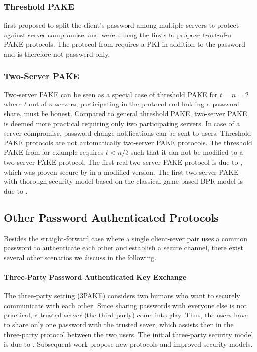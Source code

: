 \subsubsection{Threshold PAKE}
\citet{FordK00} first proposed to split the client's password among multiple servers to protect against server compromise.
\citet{RaimondoG03} and \citet{MacKenzieSJ02} were among the firsts to propose t-out-of-n \ac{PAKE} protocols.
The protocol from \citet{MacKenzieSJ02} requires a PKI in addition to the password and is therefore not password-only.

\subsubsection{Two-Server PAKE}
Two-server \ac{PAKE} can be seen as a special case of threshold PAKE for $t=n=2$ where $t$ out of $n$ servers, participating in the protocol and holding a password share, must be honest.
Compared to  general threshold \ac{PAKE}, two-server \ac{PAKE} is deemed more practical requiring only two participating servers.
In case of a server compromise, password change notifications can be sent to users.
Threshold \ac{PAKE} protocols are not automatically two-server \ac{PAKE} protocols.
The threshold \ac{PAKE} from \citet{RaimondoG03} for example requires $t<n/3$ such that it can not be modified to a two-server \ac{PAKE} protocol.
The first real two-server PAKE protocol is due to \citet{BrainardJKS03}, which was proven secure by \citet{SzydloK05} in a modified version.
The first two server PAKE with thorough security model based on the classical game-based BPR model is due to \citet{Katz2012a}.


\subsection{Other Password Authenticated Protocols} \label{sec:other-pake}
Besides the straight-forward case where a single client-sever pair uses a common password to authenticate each other and establish a secure channel, there exist several other scenarios we discuss in the following.

\paragraph{Three-Party Password Authenticated Key Exchange}
The three-party setting (3\ac{PAKE}) considers two humans who want to securely communicate with each other.
Since sharing passwords with everyone else is not practical, a trusted server (the third party) come into play.
Thus, the users have to share only one password with the trusted sever, which assists then in the three-party protocol between the two users.
The initial three-party security model is due to \citet{Abdalla2005}.
Subsequent work \cite{CliffTB06,Yoneyama08,TsaiC13} propose new protocols and improved security models.

